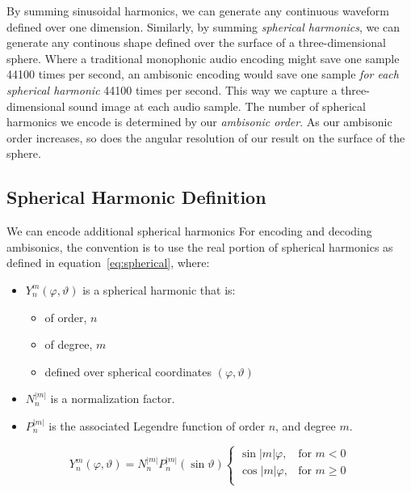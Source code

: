 By summing sinusoidal harmonics, we can generate any continuous
waveform defined over one dimension. Similarly, by summing
\emph{spherical harmonics}, we can generate any continous shape
defined over the surface of a three-dimensional sphere. Where a
traditional monophonic audio encoding might save one sample 44100
times per second, an ambisonic encoding would save one sample
\emph{for each spherical harmonic} 44100 times per second. This way we
capture a three-dimensional sound image at each audio sample.  The
number of spherical harmonics we encode is determined by our
\textit{ambisonic order}. As our ambisonic order increases, so does
the angular resolution of our result on the surface of the sphere.

\subsection{Spherical Harmonic Definition}
We can encode additional spherical harmonics 
For encoding and decoding ambisonics, the convention is to use the
real portion of spherical harmonics as defined in
equation~\ref{eq:spherical}, where:
\begin{itemize}
\item $Y_{n}^{m}(\varphi,\vartheta)$ is a spherical harmonic that
is:
\begin{itemize}
\item of order, $n$
\item of degree, $m$
\item defined over spherical coordinates $(\varphi, \vartheta)$
\end{itemize}
\item $N_n^{|m|}$ is a normalization factor.\cite{Nachbar2011}
\item $P_n^{|m|}$ is the associated Legendre function of order $n$,
  and degree $m$.
\end{itemize}
\begin{equation}
Y_{n}^{m}(\varphi,\vartheta)=N_n^{|m|}P_n^{|m|}(\sin{\vartheta})
\begin{cases}\label{eq:spherical}
\sin{|m|\varphi},&  \text{for $m<0$}\\  
\cos{|m|\varphi},& \text{for $m\geq 0$}\\
\end{cases}
\end{equation}
